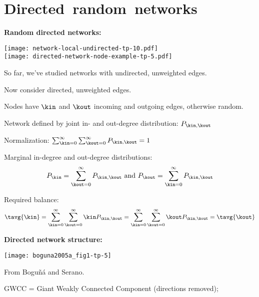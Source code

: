 \section{Directed\ random\ networks}

  \textbf{Random directed networks:}

  \small
      
    \texttt{[image: network-local-undirected-tp-10.pdf]}\\
    \texttt{[image: directed-network-node-example-tp-5.pdf]}
    
    
    
      So far, we've studied networks with undirected, unweighted edges.
    
      Now consider directed, unweighted edges.
   
    Nodes have $\kin$ and $\kout$ incoming 
    and outgoing edges, otherwise random.
    
    
   
    Network defined by joint in- and out-degree distribution: $P_{\kin,\kout}$
   
    Normalization: 
    $
    \sum_{\kin=0}^\infty
    \sum_{\kout=0}^\infty
    P_{\kin,\kout}
    = 
    1
    $
   
    Marginal in-degree and out-degree distributions:
    $$
    P_{\kin} 
    = 
    \sum_{\kout=0}^\infty
    P_{\kin,\kout}
    \ \mbox{and} \
    P_{\kout} 
    = 
    \sum_{\kin=0}^\infty
    P_{\kin,\kout}
    $$
   
    Required balance: 
    $$
    \tavg{\kin}
    =
    \sum_{\kin=0}^\infty
    \sum_{\kout=0}^\infty
    \kin
    P_{\kin,\kout}   
    = 
    \sum_{\kin=0}^\infty
    \sum_{\kout=0}^\infty
    \kout
    P_{\kin,\kout}
    =
    \tavg{\kout}
    $$
  


  \textbf{Directed network structure:}

      
    \begin{center}
      \texttt{[image: boguna2005a\_fig1-tp-5]}
    \end{center}
    \small
    From Bogu\~{n}\'{a} and Serano.\cite{boguna2005a}
    
    \small
    
     
      GWCC = Giant Weakly Connected Component (directions removed);
     
